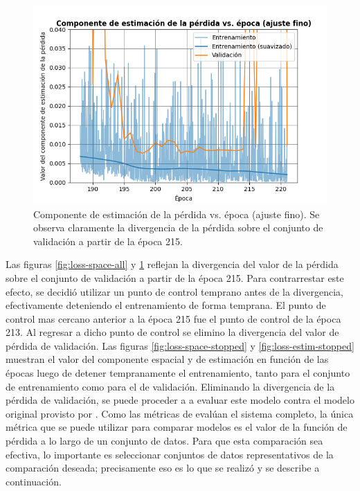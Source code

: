 \begin{figure}[H]
    \centering
    \includegraphics[scale=0.65]{partes/img/loss-estim-all.png}
    \caption[Componente de estimación de la pérdida vs. época (ajuste fino).]{Componente de estimación de la pérdida vs. época (ajuste fino). Se observa claramente la divergencia de la pérdida sobre el conjunto de validación a partir de la época 215.}
    \label{fig:loss-estim-all}
\end{figure}

Las figuras \ref{fig:loss-space-all} y \ref{fig:loss-estim-all} reflejan la divergencia del valor de la pérdida sobre el conjunto de validación a partir de la época 215. Para contrarrestar este efecto, se decidió utilizar un punto de control temprano antes de la divergencia, efectivamente deteniendo el entrenamiento de forma temprana. El punto de control mas cercano anterior a la época 215 fue el punto de control de la época 213. Al regresar a dicho punto de control se elimino la divergencia del valor de pérdida de validación. Las figuras \ref{fig:loss-space-stopped} y \ref{fig:loss-estim-stopped} muestran el valor del componente espacial y de estimación en función de las épocas luego de detener tempranamente el entrenamiento, tanto para el conjunto de entrenamiento como para el de validación. Eliminando la divergencia de la pérdida de validación, se puede proceder a a evaluar este modelo contra el modelo original provisto por \cite{Loquercio2021}. Como las métricas de \cite{Loquercio2021} evalúan el sistema completo, la única métrica que se puede utilizar para comparar modelos es el valor de la función de pérdida a lo largo de un conjunto de datos. Para que esta comparación sea efectiva, lo importante es seleccionar conjuntos de datos representativos de la comparación deseada; precisamente eso es lo que se realizó y se describe a continuación.

